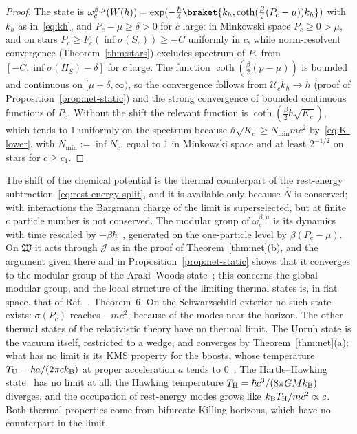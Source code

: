 \documentclass[%
 aip,
 jmp,
 amsmath,amssymb,
 reprint, onecolumn
]{revtex4-1}
\theoremstyle{definition}
\theoremstyle{remark}
\begin{document}
\begin{proof}
The state is $\omega_c^{\beta,\mu}(W(h))=\exp(-\frac\hbar4\braket{k_h,
\coth(\frac\beta2(P_c-\mu))k_h})$ with $k_h$ as in~\eqref{eq:kh}, and
$P_c-\mu\geq\delta>0$ for $c$ large: in Minkowski space $P_c\geq0>\mu$,
and on stars $P_c\geq F_c(\inf\sigma(S_c))\geq-C$ uniformly in $c$, while
norm-resolvent convergence (Theorem~\ref{thm:stars}) excludes spectrum of
$P_c$ from $[-C,\inf\sigma(H_S)-\delta]$ for $c$ large. The function
$\coth(\frac\beta2(p-\mu))$ is bounded and continuous on
$[\mu+\delta,\infty)$, so the convergence follows from $\mathcal{U}_c
k_h\to h$ (proof of Proposition~\ref{prop:net-static}) and the strong
convergence of bounded continuous functions of $P_c$. Without the shift
the relevant function is $\coth(\frac\beta2\hbar\sqrt{K_c})$, which tends
to $1$ uniformly on the spectrum because $\hbar\sqrt{K_c}\geq N_{\min}
mc^2$ by~\eqref{eq:K-lower}, with $N_{\min}:=\inf N_c$, equal to $1$ in
Minkowski space and at least $2^{-1/2}$ on stars for $c\geq c_1$.
\end{proof}

The shift of the chemical potential is the thermal counterpart of the
rest-energy subtraction~\eqref{eq:rest-energy-split}, and it is
available only because $\hat N$ is conserved; with interactions the
Bargmann charge of the limit is superselected, but at finite $c$ particle
number is not conserved. The modular group of $\omega_c^{\beta,\mu}$ is
its dynamics with time rescaled by
$-\beta\hbar$~\cite{HaagHugenholtzWinnink1967,Takesaki1970}, generated on the
one-particle level by $\beta(P_c-\mu)$. On $\mathfrak W$ it acts through
$\mathcal J$ as in the proof of Theorem~\ref{thm:net}(b), and the
argument given there and in Proposition~\ref{prop:net-static} shows that
it converges to the modular group of the Araki--Woods
state~\cite{ArakiWoods1963}; this concerns the global modular group, and
the local structure of the limiting thermal states is, in flat space,
that of Ref.~,
Theorem~6. On the
Schwarzschild exterior no such state exists: $\sigma(P_c)$ reaches
$-mc^2$, because of the modes near the horizon. The other thermal states
of the relativistic theory have no thermal limit. The Unruh state is the
vacuum itself, restricted to a wedge, and converges by
Theorem~\ref{thm:net}(a); what has no limit is its KMS property for the
boosts, whose temperature $T_{\rm U}=\hbar a/(2\pi ck_{\rm B})$ at proper
acceleration $a$ tends to $0$~\cite{Unruh1976}. The Hartle--Hawking
state~\cite{HartleHawking1976} has no limit at all: the Hawking
temperature $T_{\rm H}=\hbar c^3/(8\pi GMk_{\rm B})$ diverges, and the
occupation of rest-energy modes grows like $k_{\rm B}T_{\rm H}/mc^2
\propto c$. Both thermal properties come from bifurcate Killing horizons,
which have no counterpart in the limit.
\end{document}
